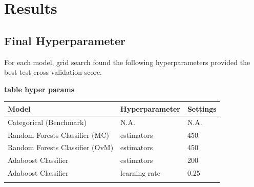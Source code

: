 \documentclass{bioinfo}
\begin{document}
\section{Results}

\subsection{Final Hyperparameter}
For each model, grid search found the following hyperparameters provided the best test cross validation score.

\textbf{table hyper params }


\begin{table}[!h]
 {\begin{tabular}{@{}lll@{}}\toprule Model  & Hyperparameter & Settings \\\midrule
Categorical (Benchmark) & N.A. &  N.A.   \\
Random Forests Classifier (MC) & estimators & 450 \\
Random Forests Classifier (OvM)& estimators & 450 \\
Adaboost Classifier & estimators & 200 \\
Adaboost Classifier & learning rate & 0.25 \\\botrule
\end{tabular}}{}
\end{table}

\end{document}
